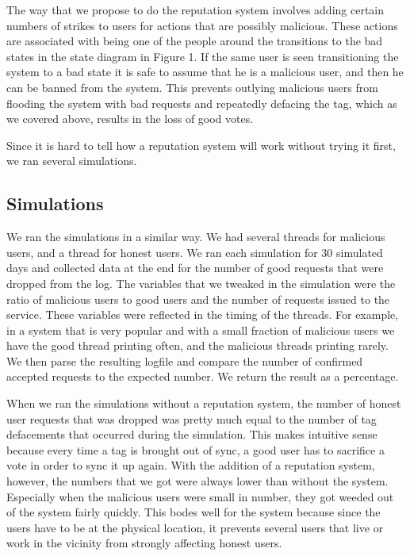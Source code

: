 \documentclass{sig-alternate}
\begin{document}
The way that we propose to do the reputation system involves adding
certain numbers of strikes to users for actions that are possibly
malicious. These actions are associated with being one of the people
around the transitions to the bad states in the state diagram in
Figure 1. If the same user is seen transitioning the system to a bad
state it is safe to assume that he is a malicious user, and then he
can be banned from the system. This prevents outlying malicious users
from flooding the system with bad requests and repeatedly defacing the
tag, which as we covered above, results in the loss of good votes.

Since it is hard to tell how a reputation system will work without
trying it first, we ran several simulations.

\subsection{Simulations}
We ran the simulations in a similar way. We had several threads for
malicious users, and a thread for honest users. We ran each simulation
for 30 simulated days and collected data at the end for the number of
good requests that were dropped from the log. The variables that we
tweaked in the simulation were the ratio of malicious users to good
users and the number of requests issued to the service. These
variables were reflected in the timing of the threads. For example, in
a system that is very popular and with a small fraction of malicious
users we have the good thread printing often, and the malicious
threads printing rarely. We then parse the resulting logfile and
compare the number of confirmed accepted requests to the expected
number. We return the result as a percentage.

When we ran the simulations without a reputation system, the number of
honest user requests that was dropped was pretty much equal to the
number of tag defacements that occurred during the simulation. This
makes intuitive sense because every time a tag is brought out of sync,
a good user has to sacrifice a vote in order to sync it up again. With
the addition of a reputation system, however, the numbers that we got
were always lower than without the system. Especially when the
malicious users were small in number, they got weeded out of the
system fairly quickly. This bodes well for the system because since
the users have to be at the physical location, it prevents several
users that live or work in the vicinity from strongly affecting honest
users.
\end{document}
